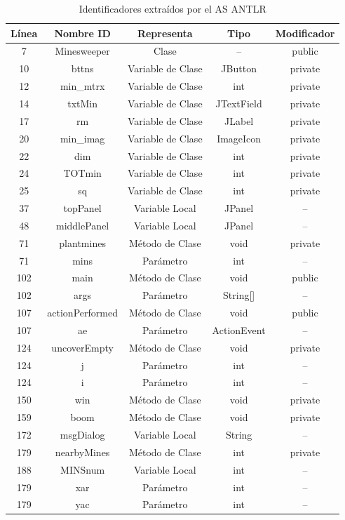\begin{table}
\centering
	\begin{tabular}{| c | c | c | c | c |}      
       \hline
  	   \textbf{Línea} & \textbf{Nombre ID} & \textbf{Representa} & \textbf{Tipo} & \textbf{Modificador} \\ \hline
7&Minesweeper&Clase&--&public \\ \hline
10&bttns&Variable de Clase&JButton&private \\ \hline
12&min\_mtrx&Variable de Clase&int&private \\ \hline
14&txtMin&Variable de Clase&JTextField&private \\ \hline
17&rm&Variable de Clase&JLabel&private \\ \hline
20&min\_imag&Variable de Clase&ImageIcon&private \\ \hline
22&dim&Variable de Clase&int&private \\ \hline
24&TOTmin&Variable de Clase&int&private \\ \hline
25&sq&Variable de Clase&int&private \\ \hline
37&topPanel&Variable Local&JPanel&-- \\ \hline
48&middlePanel&Variable Local&JPanel&-- \\ \hline
71&plantmines&Método de Clase&void&private \\ \hline
71&mins&Parámetro&int&-- \\ \hline
102&main&Método de Clase&void&public \\ \hline
102&args&Parámetro&String[]&-- \\ \hline
107&actionPerformed&Método de Clase&void&public \\ \hline
107&ae&Parámetro&ActionEvent&-- \\ \hline
124&uncoverEmpty&Método de Clase&void&private \\ \hline
124&j&Parámetro&int&-- \\ \hline
124&i&Parámetro&int&-- \\ \hline
150&win&Método de Clase&void&private \\ \hline
159&boom&Método de Clase&void&private \\ \hline
172&msgDialog&Variable Local&String&-- \\ \hline
179&nearbyMines&Método de Clase&int&private \\ \hline
188&MINSnum&Variable Local&int&-- \\ \hline
179&xar&Parámetro&int&-- \\ \hline
179&yac&Parámetro&int&-- \\ \hline
   
   	\end{tabular}  
	 
   \caption{Identificadores extraídos por el AS ANTLR}
   \label{tabla2}
     
\end{table} 



